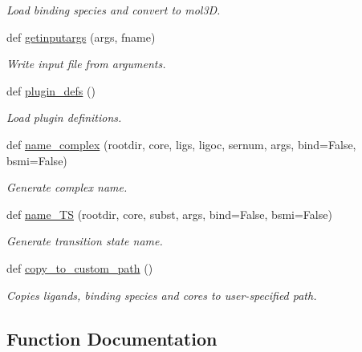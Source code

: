 \begin{DoxyCompactItemize}
\begin{DoxyCompactList}\small\item\em Load binding species and convert to mol3D. \end{DoxyCompactList}\item 
def \hyperlink{namespacemolSimplify_1_1Scripts_1_1io_a35adde459c31b3eeb5eb3b3f2a38a223}{getinputargs} (args, fname)
\begin{DoxyCompactList}\small\item\em Write input file from arguments. \end{DoxyCompactList}\item 
def \hyperlink{namespacemolSimplify_1_1Scripts_1_1io_a40650c28fe10183161a82e7127674f61}{plugin\+\_\+defs} ()
\begin{DoxyCompactList}\small\item\em Load plugin definitions. \end{DoxyCompactList}\item 
def \hyperlink{namespacemolSimplify_1_1Scripts_1_1io_a46e78fd50789df0a774ccbe02fb87206}{name\+\_\+complex} (rootdir, core, ligs, ligoc, sernum, args, bind=False, bsmi=False)
\begin{DoxyCompactList}\small\item\em Generate complex name. \end{DoxyCompactList}\item 
def \hyperlink{namespacemolSimplify_1_1Scripts_1_1io_a11b47a571bc01ae75ddbb581dc577349}{name\+\_\+\+TS} (rootdir, core, subst, args, bind=False, bsmi=False)
\begin{DoxyCompactList}\small\item\em Generate transition state name. \end{DoxyCompactList}\item 
def \hyperlink{namespacemolSimplify_1_1Scripts_1_1io_ae7ce81f03a95bf70a0356d8075a4c9f3}{copy\+\_\+to\+\_\+custom\+\_\+path} ()
\begin{DoxyCompactList}\small\item\em Copies ligands, binding species and cores to user-\/specified path. \end{DoxyCompactList}\end{DoxyCompactItemize}


\subsection{Function Documentation}
\mbox{\label{namespacemolSimplify_1_1Scripts_1_1io_ad95d532bb8edb4c9c6ee556ba093b7e1}} 
